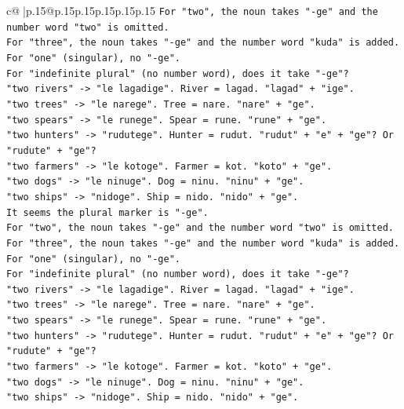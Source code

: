 \documentclass{article}
\begin{document}
{\begin{supertabular}{c@{$\;$}|p{.15\linewidth}@{}p{.15\linewidth}p{.15\linewidth}p{.15\linewidth}p{.15\linewidth}p{.15\linewidth}}
{{{\texttt{For "two", the noun takes "{-}ge" and the number word "two" is omitted.} \\
\texttt{For "three", the noun takes "{-}ge" and the number word "kuda" is added.} \\
\texttt{For "one" (singular), no "{-}ge".} \\
\texttt{For "indefinite plural" (no number word), does it take "{-}ge"?} \\
\texttt{"two rivers" {-}> "le lagadige". River = lagad. "lagad" + "ige".} \\
\texttt{"two trees" {-}> "le narege". Tree = nare. "nare" + "ge".} \\
\texttt{"two spears" {-}> "le runege". Spear = rune. "rune" + "ge".} \\
\texttt{"two hunters" {-}> "rudutege". Hunter = rudut. "rudut" + "e" + "ge"? Or "rudute" + "ge"?} \\
\texttt{"two farmers" {-}> "le kotoge". Farmer = kot. "koto" + "ge".} \\
\texttt{"two dogs" {-}> "le ninuge". Dog = ninu. "ninu" + "ge".} \\
\texttt{"two ships" {-}> "nidoge". Ship = nido. "nido" + "ge".} \\
\texttt{It seems the plural marker is "{-}ge".} \\
\texttt{For "two", the noun takes "{-}ge" and the number word "two" is omitted.} \\
\texttt{For "three", the noun takes "{-}ge" and the number word "kuda" is added.} \\
\texttt{For "one" (singular), no "{-}ge".} \\
\texttt{For "indefinite plural" (no number word), does it take "{-}ge"?} \\
\texttt{"two rivers" {-}> "le lagadige". River = lagad. "lagad" + "ige".} \\
\texttt{"two trees" {-}> "le narege". Tree = nare. "nare" + "ge".} \\
\texttt{"two spears" {-}> "le runege". Spear = rune. "rune" + "ge".} \\
\texttt{"two hunters" {-}> "rudutege". Hunter = rudut. "rudut" + "e" + "ge"? Or "rudute" + "ge"?} \\
\texttt{"two farmers" {-}> "le kotoge". Farmer = kot. "koto" + "ge".} \\
\texttt{"two dogs" {-}> "le ninuge". Dog = ninu. "ninu" + "ge".} \\
\texttt{"two ships" {-}> "nidoge". Ship = nido. "nido" + "ge".} \\
}}}
\end{supertabular}}
\end{document}
